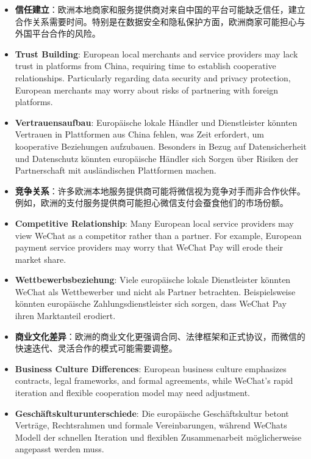 \documentclass[11pt,a4paper]{article}
\begin{document}
\begin{itemize}
    \item \textbf{信任建立}：欧洲本地商家和服务提供商对来自中国的平台可能缺乏信任，建立合作关系需要时间。特别是在数据安全和隐私保护方面，欧洲商家可能担心与外国平台合作的风险。
    \item \textbf{Trust Building}: European local merchants and service providers may lack trust in platforms from China, requiring time to establish cooperative relationships. Particularly regarding data security and privacy protection, European merchants may worry about risks of partnering with foreign platforms.
    \item \textbf{Vertrauensaufbau}: Europäische lokale Händler und Dienstleister könnten Vertrauen in Plattformen aus China fehlen, was Zeit erfordert, um kooperative Beziehungen aufzubauen. Besonders in Bezug auf Datensicherheit und Datenschutz könnten europäische Händler sich Sorgen über Risiken der Partnerschaft mit ausländischen Plattformen machen.
    
    \item \textbf{竞争关系}：许多欧洲本地服务提供商可能将微信视为竞争对手而非合作伙伴。例如，欧洲的支付服务提供商可能担心微信支付会蚕食他们的市场份额。
    \item \textbf{Competitive Relationship}: Many European local service providers may view WeChat as a competitor rather than a partner. For example, European payment service providers may worry that WeChat Pay will erode their market share.
    \item \textbf{Wettbewerbsbeziehung}: Viele europäische lokale Dienstleister könnten WeChat als Wettbewerber und nicht als Partner betrachten. Beispielsweise könnten europäische Zahlungsdienstleister sich sorgen, dass WeChat Pay ihren Marktanteil erodiert.
    
    \item \textbf{商业文化差异}：欧洲的商业文化更强调合同、法律框架和正式协议，而微信的快速迭代、灵活合作的模式可能需要调整。
    \item \textbf{Business Culture Differences}: European business culture emphasizes contracts, legal frameworks, and formal agreements, while WeChat's rapid iteration and flexible cooperation model may need adjustment.
    \item \textbf{Geschäftskulturunterschiede}: Die europäische Geschäftskultur betont Verträge, Rechtsrahmen und formale Vereinbarungen, während WeChats Modell der schnellen Iteration und flexiblen Zusammenarbeit möglicherweise angepasst werden muss.
\end{itemize}
\end{document}

